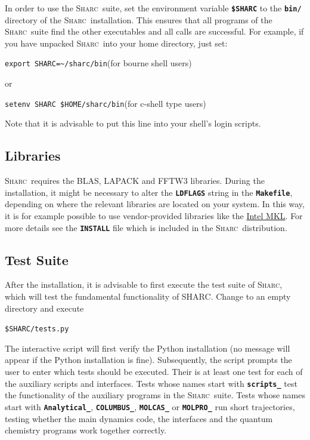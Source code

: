 \documentclass[a4paper,11pt,DIV=15,openany,twoside=false]{scrbook}
\newcommand{\sharc}{\textsc{Sharc}}
\newcommand{\ttt}[1]{\textbf{\texttt{#1}}}
\newenvironment{example}{
  \vspace{0mm}
  \definecolor{shadecolor}{HTML}{E4F4FF}
  \begin{shaded}
}{
  \end{shaded}
}
\begin{document}
In order to use the \sharc\ suite, set the environment variable \ttt{\$SHARC} to the \ttt{bin/} directory of the \sharc\ installation. This ensures that all programs of the \sharc\ suite find the other executables and all calls are successful. For example, if you have unpacked \sharc\ into your home directory, 
just set: 
\begin{example}
\verb|export SHARC=~/sharc/bin|\quad (for bourne shell users)
\end{example}
or
\begin{example}
\verb|setenv SHARC $HOME/sharc/bin|\quad (for c-shell type users)
\end{example}
Note that it is advisable to put this line into your shell's login
scripts.

\subsection{Libraries}

\sharc\ requires the BLAS, LAPACK and FFTW3 libraries. During the installation, it might be necessary to alter the \ttt{LDFLAGS} string in the \ttt{Makefile}, depending on where the relevant libraries are located on your system. In this way, it is for example possible to use vendor-provided libraries like the \href{https://software.intel.com/en-us/intel-mkl}{Intel MKL}. For more details see the \ttt{INSTALL} file which is included in the \sharc\ distribution.

\subsection{Test Suite}

After the installation, it is advisable to first execute the test suite of \sharc, which will test the fundamental functionality of SHARC.
Change to an empty directory and execute
\begin{example}
\verb|$SHARC/tests.py|
\end{example}
The interactive script will first verify the Python installation (no message will appear if the Python installation is fine). Subsequently, the script prompts the user to enter which tests should be executed. Their is at least one test for each of the auxiliary scripts and interfaces. Tests whose names start with \ttt{scripts\_} test the functionality of the auxiliary programs in the \sharc\ suite. Tests whose names start with \ttt{Analytical\_}, \ttt{COLUMBUS\_}, \ttt{MOLCAS\_} or \ttt{MOLPRO\_} run short trajectories, testing whether the main dynamics code, the interfaces and the quantum chemistry programs work together correctly.
\end{document}

